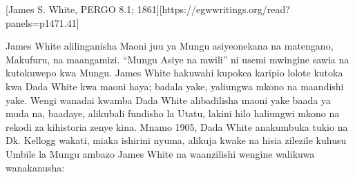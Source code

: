 [James S. White, PERGO 8.1; 1861][https://egwwritings.org/read?panels=p1471.41]


James White alilinganisha Maoni juu ya Mungu asiyeonekana na matengano, Makufuru, na maangamizi. “Mungu Asiye na mwili” ni usemi mwingine sawia na kutokuwepo kwa Mungu. James White hakuwahi kupokea karipio lolote kutoka kwa Dada White kwa maoni haya; badala yake, yaliungwa mkono na maandishi yake. Wengi wanadai kwamba Dada White alibadilisha maoni yake baada ya muda na, baadaye, alikubali fundisho la Utatu, lakini hilo haliungwi mkono na rekodi za kihistoria zenye kina. Mnamo 1905, Dada White anakumbuka tukio na Dk. Kellogg wakati, miaka ishirini nyuma, alikuja kwake na hisia zilezile kuhusu Umbile la Mungu ambazo James White na waanzilishi wengine walikuwa wanakanusha:


